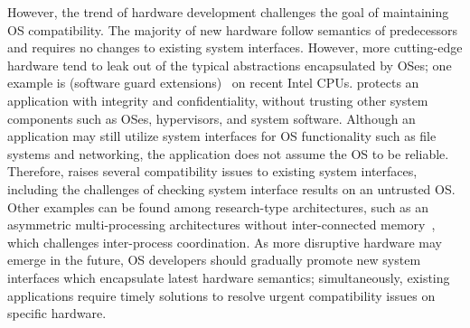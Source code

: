 However, the trend of hardware development
challenges the goal of maintaining OS compatibility.
The majority of new hardware follow semantics of predecessors
and requires no changes to existing system interfaces.
However, more cutting-edge hardware tend to leak out of
the typical abstractions
encapsulated by OSes;
one example is \sgx{} (software guard extensions)~\cite{intelsgx}
on recent Intel CPUs.
\sgx{} protects an application
with integrity and confidentiality, without trusting other system components 
such as OSes, hypervisors, and system software.
Although an \sgx{} application
may still utilize system interfaces for OS functionality
such as file systems and networking, the application does not assume
the OS to be reliable.
Therefore, \sgx{} raises several compatibility issues to
existing system interfaces,
including the challenges of checking system interface results
on an untrusted OS.
Other examples can be found among research-type architectures,
such as an asymmetric multi-processing architectures
without inter-connected memory~\cite{gschwind2007,cascaval2002evaluation},
which challenges inter-process coordination.
As more disruptive hardware
may emerge in the future, OS developers should
gradually promote new system interfaces which encapsulate latest hardware semantics; simultaneously, existing applications require timely solutions to resolve urgent compatibility issues on specific hardware.


